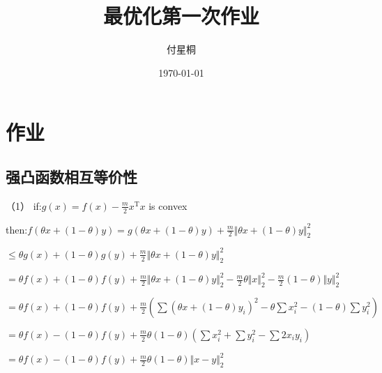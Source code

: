 \documentclass[12pt, a4paper, oneside, fontset=windows]{ctexart}
\title{\textbf{最优化第一次作业}}
\author{付星桐}
\date{\today}
\begin{document}
\pagestyle{empty}
\maketitle

\setcounter{page}{0}
\maketitle
\thispagestyle{empty}



\newpage
\setcounter{page}{1}
\tableofcontents
\newpage
\setcounter{page}{1}

\newpage
\section{作业}

\subsection{强凸函数相互等价性}
（1）
if:$g\left ( x \right )=f\left ( x \right )-\frac{m}{2}x ^\mathrm{T}x$ is convex

then:$f(\theta x+\left ( 1-\theta  \right )y)=g\left (\theta x+\left ( 1-\theta  \right )y  \right )+\frac{m}{2} \Vert \theta x+\left ( 1-\theta  \right )y \Vert _2^{2}$

$\leq \theta g\left ( x \right )+\left ( 1-\theta  \right )g\left ( y \right )+\frac{m}{2} \Vert \theta x+\left ( 1-\theta  \right )y \Vert _2^{2}$

$= \theta f\left ( x \right )+\left ( 1-\theta  \right )f\left ( y \right )+\frac{m}{2} \Vert \theta x+\left ( 1-\theta  \right )y \Vert _2^{2}-\frac{m}{2}\theta \Vert x \Vert _2^{2}-\frac{m}{2}\left ( 1-\theta  \right )\Vert y \Vert _2^{2}$

$=\theta f\left ( x \right )+\left ( 1-\theta  \right )f\left ( y \right )+\frac{m}{2}\left (\sum \left ( \theta x+\left ( 1-\theta  \right )y _{i} \right )^{2}-\theta  \sum x _{i}^{2}-\left ( 1-\theta  \right )\sum y _{i}^{2} \right )$

$=\theta f\left ( x \right )-\left ( 1-\theta  \right )f\left ( y \right )+\frac{m}{2}\theta \left ( 1-\theta  \right )\left (  \sum x _{i}^{2}+\sum y _{i}^{2}- \sum 2x_{i}y _{i}\right )$

$=\theta f\left ( x \right )-\left ( 1-\theta  \right )f\left ( y \right )+\frac{m}{2} \theta \left ( 1-\theta  \right )\Vert x-y \Vert _2^{2}$
\end{document}
